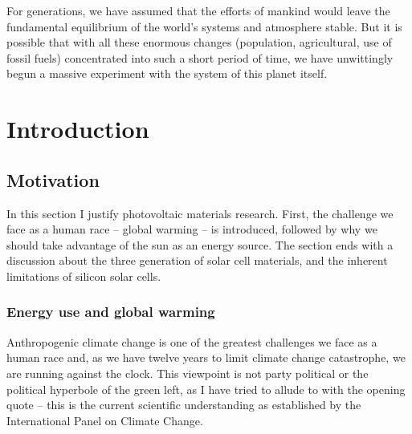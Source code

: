 \begin{savequote}[8cm]
For generations, we have assumed that the efforts of mankind would leave the fundamental equilibrium of the world's systems and atmosphere stable. But it is possible that with all these enormous changes (population, agricultural, use of fossil fuels) concentrated into such a short period of time, we have unwittingly begun a massive experiment with the system of this planet itself.
\end{savequote}

\chapter{\label{ch:1-intro}Introduction} 

\minitoc

\section{Motivation}

In this section I justify photovoltaic materials research. First, the challenge we face as a human race -- global warming -- is introduced, followed by why we should take advantage of the sun as an energy source. The section ends with a discussion about the three generation of solar cell materials, and the inherent limitations of silicon solar cells.

\subsection{Energy use and global warming}

Anthropogenic climate change is one of the greatest challenges we face as a human race and, as we have twelve years to limit climate change catastrophe, we are running against the clock. This viewpoint is not party political or the political hyperbole of the green left, as I have tried to allude to with the opening quote -- this is the current scientific understanding as established by the International Panel on Climate Change.\autocite{IPCC2018}

